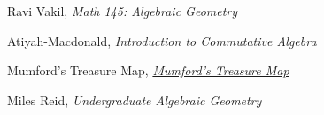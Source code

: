 \documentclass[]{report}
\begin{document}
\begin{thebibliography}{9}

    Ravi Vakil,
    \textit{Math 145: Algebraic Geometry}

    Atiyah-Macdonald, 
    \textit{Introduction to Commutative Algebra}

    Mumford's Treasure Map,
    \href{https://web.archive.org/web/20201130150255/http://www.neverendingbooks.org/mumfords-treasure-map}{\textit{Mumford's Treasure Map}}

    Miles Reid,
    \textit{Undergraduate Algebraic Geometry}
\end{thebibliography}
\end{document}
